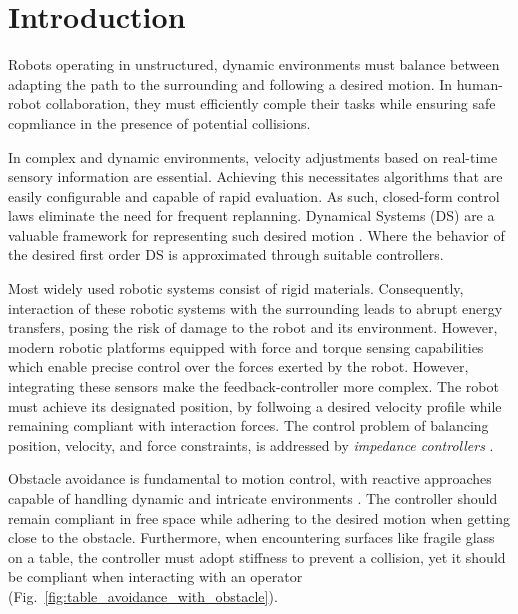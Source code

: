\section{Introduction}
Robots operating in unstructured, dynamic environments must balance between adapting the path to the surrounding and following a desired motion. In human-robot collaboration, they must efficiently comple their tasks while ensuring safe copmliance in the presence of potential collisions.

In complex and dynamic environments, velocity adjustments based on real-time sensory information are essential. Achieving this necessitates algorithms that are easily configurable and capable of rapid evaluation. As such, closed-form control laws eliminate the need for frequent replanning. Dynamical Systems (DS) are a valuable framework for representing such desired motion \cite{huber2019avoidance}. Where the behavior of the desired first order DS is approximated through suitable controllers. 

Most widely used robotic systems consist of rigid materials. Consequently, interaction of these robotic systems with the surrounding leads to abrupt energy transfers, posing the risk of damage to the robot and its environment. However, modern robotic platforms equipped with force and torque sensing capabilities which enable precise control over the forces exerted by the robot.
However, integrating these sensors make the feedback-controller more complex. The robot must achieve its designated position, by follwoing a desired velocity profile while remaining compliant with interaction forces. The control problem of balancing position, velocity, and force constraints, is addressed by \textit{impedance controllers} \iflong
\parencite{takegaki1981new, hogan1984impedance} \else \parencite{hogan1985impedance}\fi.

Obstacle avoidance is fundamental to motion control, with reactive approaches capable of handling dynamic and intricate environments \parencite{huber2019avoidance}. The controller should remain compliant in free space while adhering to the desired motion when getting close to the obstacle. Furthermore, when encountering surfaces like fragile glass on a table, the controller must adopt stiffness to prevent a collision, yet it should be compliant when interacting with an operator (Fig.~\ref{fig:table_avoidance_with_obstacle}).

